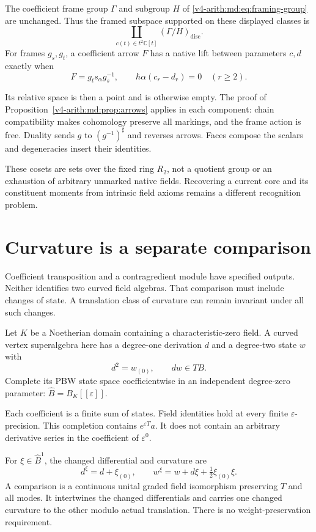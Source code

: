 The coefficient frame group $\Gamma$
and subgroup $H$ of
\eqref{v4-arith:md:eq:framing-group}
are unchanged. Thus the framed subspace
supported on these displayed classes is
\[
 \coprod_{c(t)\in t^2\mathbb C[t]}
             (\Gamma/H)_{\mathrm{disc}}.
\]
For frames $g_s,g_t$, a coefficient arrow
$F$ has a native lift between parameters
$c,d$ exactly when
\[
 F=g_ts_\alpha g_s^{-1},\qquad
 \hbar\alpha(c_r-d_r)=0\quad(r\geq2).
\]

Its relative space is then a point and
is otherwise empty.
The proof of
Proposition~\ref{v4-arith:md:prop:arrows}
applies in each component: chain
compatibility makes cohomology preserve
all markings, and the frame action is
free. Duality sends $g$ to
$(g^{-1})^\sharp$ and reverses arrows.
Faces compose the scalars and
degeneracies insert their identities.

These cosets are sets over the fixed
ring $R_2$, not a quotient group or an
exhaustion of arbitrary unmarked native
fields. Recovering a current core and
its constituent moments from intrinsic
field axioms remains a different
recognition problem.

\section{Curvature is a separate comparison}
\label{v4-arith:md:sec:curvature}

Coefficient transposition and a contragredient
module have specified outputs. Neither
identifies two curved field algebras.
That comparison must include changes of
state. A translation class of curvature
can remain invariant under all such changes.

Let $K$ be a Noetherian domain containing
a characteristic-zero field.
A curved vertex superalgebra here has a
degree-one derivation $d$ and a degree-two
state $w$ with
\[
 d^2=w_{(0)},\qquad dw\in TB.
\]
Complete its PBW state space coefficientwise
in an independent degree-zero parameter:
$\widehat B=B_K[[\varepsilon]]$.

Each coefficient is a finite sum of states.
Field identities hold at every finite
$\varepsilon$-precision.
This completion contains $e^{\varepsilon T}a$.
It does not contain an arbitrary derivative
series in the coefficient of
$\varepsilon^0$.

For $\xi\in\widehat B^1$, the changed
differential and curvature are
\begin{equation}\label{v4-arith:md:eq:curved-change}
 d^\xi=d+\xi_{(0)},\qquad
 w^\xi=w+d\xi+\tfrac12\xi_{(0)}\xi.
\end{equation}
A comparison is a continuous unital
graded field isomorphism preserving
$T$ and all modes.
It intertwines the changed differentials
and carries one changed curvature to
the other modulo actual translation.
There is no weight-preservation
requirement.

